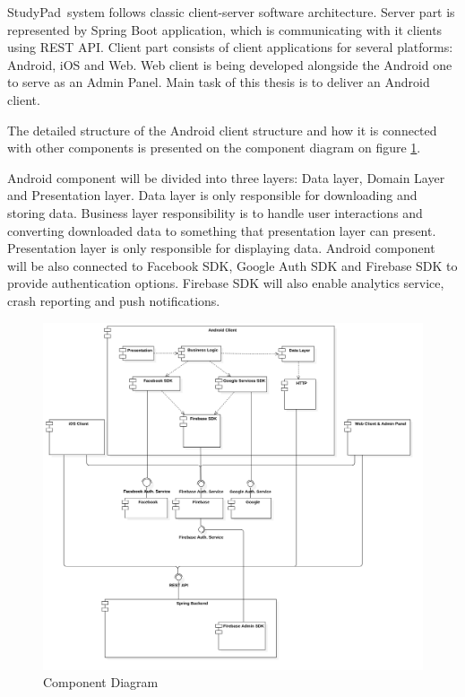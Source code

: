 \documentclass[thesis=B,english]{FITthesis}[2012/10/20]
\newcommand{\appname}{StudyPad}
\begin{document}
\appname\ system follows classic client-server software architecture. Server part is represented by Spring Boot application, which is communicating with it clients using REST API. Client part consists of client applications for several platforms: Android, iOS and Web. Web client is being developed alongside the Android one to serve as an Admin Panel. Main task of this thesis is to deliver an Android client.

The detailed structure of the Android client structure and how it is connected with other components is presented on the component diagram on figure \ref{fig:component}. 

 Android component will be divided into three layers: Data layer, Domain Layer and Presentation layer. Data layer is only responsible for downloading and storing data. Business layer responsibility is to handle user interactions and converting downloaded data to something that presentation layer can present. Presentation layer is only responsible for displaying data. Android component will be also connected to Facebook SDK, Google Auth SDK and Firebase SDK to provide authentication options. Firebase SDK will also enable analytics service, crash reporting and push notifications.
\newpage
\begin{figure}[H]
  \includegraphics[scale=0.4]{deployment}
  \caption{Component Diagram}
  \label{fig:component}
\end{figure}
\end{document}
